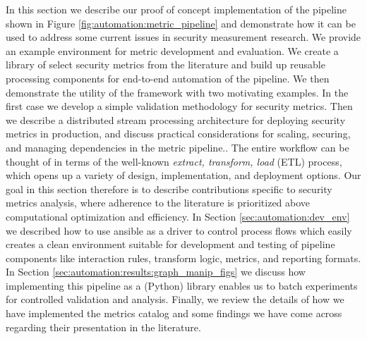 
In this section we describe our proof of concept implementation of the pipeline shown in Figure \ref{fig:automation:metric_pipeline} and demonstrate how it can be used to address some current issues in security measurement research. We provide an example environment for metric development and evaluation. We create a library of select security metrics from the literature and build up reusable processing components for end-to-end automation of the pipeline. We then demonstrate the utility of the framework with two motivating examples. In the first case we develop a simple validation methodology for security metrics. Then we describe a distributed stream processing architecture for deploying security metrics in production, and discuss practical considerations for scaling, securing, and managing dependencies in the metric pipeline.. The entire workflow can be thought of in terms of the well-known \textit{extract, transform, load} (ETL) process, which opens up a variety of design, implementation, and deployment options. Our goal in this section therefore is to describe contributions specific to security metrics analysis, where adherence to the literature is prioritized above computational optimization and efficiency. In Section \ref{sec:automation:dev_env} we described how to use ansible as a driver to control process flows which easily creates a clean environment suitable for development and testing of pipeline components like interaction rules, transform logic, metrics, and reporting formats. In Section \ref{sec:automation:results:graph_manip_figs} we discuss how implementing this pipeline as a (Python) library enables us to batch experiments for controlled validation and analysis. Finally, we review the details of how we have implemented the metrics catalog and some findings we have come across regarding their presentation in the literature.

